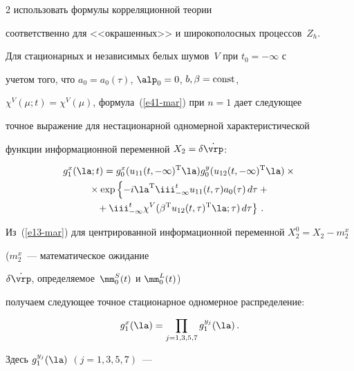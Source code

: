 \begin{multicols}{2}
использовать формулы корреляционной теории~\cite{11-mar}


соответственно для <<окрашенных>> и широкополосных процессов~$Z_h$.





Для стационарных и независимых белых шумов~$V$ при $t_0=-\infty$ с


учетом того, что $a_0=a_0(\tau)$, $\alp_0=0$, $b,\beta={\rm const}$,


$\chi^V (\mu;t) =\chi^V(\mu)$, формула~(\ref{e41-mar}) при $n=1$ дает следующее


точное выражение для нестационарной одномерной характеристической


функции информационной переменной  $X_2 =\delta \dot\vrp$:





\noindent


\begin{multline*}


g_1^x (\la;t) =g_0^x (u_{11} (t,-\infty)^{\mathrm{T}}\la)g_0^y (u_{12} 


(t,-\infty)^{\mathrm{T}}\la)\times{}\\


{}\times \exp\left\{ -i\la^{\mathrm{T}} \iii_{-\infty}^t u_{11}(t,\tau) a_0(\tau) \,d\tau+{}\right.\\


\left.{}+


    \iii_{-\infty}^t \chi^V (\beta^{\mathrm{T}} u_{12} (t,\tau)^{\mathrm{T}}


    \la;\tau) \,d\tau\right\}\,. %


    \end{multline*}


Из~(\ref{e13-mar}) для центрированной информационной переменной $X_2^0 = X_2-m_2^x$ 


($m_2^x$~--- математическое ожидание


$\delta\dot\vrp$, определяемое~$\mm_0^S(t)$ и $\mm_0^L(t)$)


получаем следующее точное стационарное одномерное распределение:


\begin{equation}


g_1^x (\la)=\prod\limits_{j=1,3,5,7} g_1^{y_j}(\la)\,.\label{e44-mar}


\end{equation}


Здесь $g_1^{y_j}(\la)$ $(j=1,3,5,7)$~--- 



\end{multicols}
